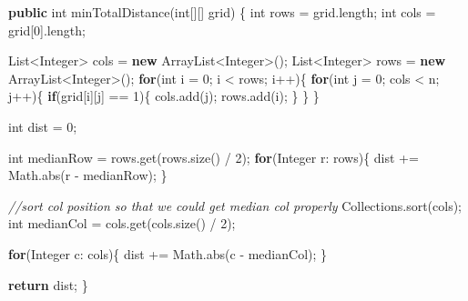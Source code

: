 \documentclass[]{book}
\newenvironment{Shaded}{\begin{snugshade}}{\end{snugshade}}
\newcommand{\BuiltInTok}[1]{#1}
\newcommand{\CommentTok}[1]{\textcolor[rgb]{0.56,0.35,0.01}{\textit{#1}}}
\newcommand{\DataTypeTok}[1]{\textcolor[rgb]{0.13,0.29,0.53}{#1}}
\newcommand{\DecValTok}[1]{\textcolor[rgb]{0.00,0.00,0.81}{#1}}
\newcommand{\FunctionTok}[1]{\textcolor[rgb]{0.00,0.00,0.00}{#1}}
\newcommand{\KeywordTok}[1]{\textcolor[rgb]{0.13,0.29,0.53}{\textbf{#1}}}
\newcommand{\NormalTok}[1]{#1}
\begin{document}
\begin{Shaded}
\begin{Highlighting}[]
\KeywordTok{public} \DataTypeTok{int} \FunctionTok{minTotalDistance}\NormalTok{(}\DataTypeTok{int}\NormalTok{[][] grid) \{}
    \DataTypeTok{int}\NormalTok{ rows = grid.}\FunctionTok{length}\NormalTok{;}
    \DataTypeTok{int}\NormalTok{ cols = grid[}\DecValTok{0}\NormalTok{].}\FunctionTok{length}\NormalTok{;}

    \BuiltInTok{List}\NormalTok{<}\BuiltInTok{Integer}\NormalTok{> cols = }\KeywordTok{new} \BuiltInTok{ArrayList}\NormalTok{<}\BuiltInTok{Integer}\NormalTok{>();}
    \BuiltInTok{List}\NormalTok{<}\BuiltInTok{Integer}\NormalTok{> rows = }\KeywordTok{new} \BuiltInTok{ArrayList}\NormalTok{<}\BuiltInTok{Integer}\NormalTok{>();}
    \KeywordTok{for}\NormalTok{(}\DataTypeTok{int}\NormalTok{ i = }\DecValTok{0}\NormalTok{; i < rows; i++)\{}
        \KeywordTok{for}\NormalTok{(}\DataTypeTok{int}\NormalTok{ j = }\DecValTok{0}\NormalTok{; cols < n; j++)\{}
            \KeywordTok{if}\NormalTok{(grid[i][j] == }\DecValTok{1}\NormalTok{)\{}
\NormalTok{                cols.}\FunctionTok{add}\NormalTok{(j);}
\NormalTok{                rows.}\FunctionTok{add}\NormalTok{(i);}
\NormalTok{            \}}
\NormalTok{        \}}
\NormalTok{    \}}

    \DataTypeTok{int}\NormalTok{ dist = }\DecValTok{0}\NormalTok{;}

    \DataTypeTok{int}\NormalTok{ medianRow = rows.}\FunctionTok{get}\NormalTok{(rows.}\FunctionTok{size}\NormalTok{() / }\DecValTok{2}\NormalTok{);}
    \KeywordTok{for}\NormalTok{(}\BuiltInTok{Integer}\NormalTok{ r: rows)\{}
\NormalTok{        dist += }\BuiltInTok{Math}\NormalTok{.}\FunctionTok{abs}\NormalTok{(r - medianRow);}
\NormalTok{    \}}

    \CommentTok{//sort col position so that we could get median col properly}
    \BuiltInTok{Collections}\NormalTok{.}\FunctionTok{sort}\NormalTok{(cols);}
    \DataTypeTok{int}\NormalTok{ medianCol = cols.}\FunctionTok{get}\NormalTok{(cols.}\FunctionTok{size}\NormalTok{() / }\DecValTok{2}\NormalTok{);}

    \KeywordTok{for}\NormalTok{(}\BuiltInTok{Integer}\NormalTok{ c: cols)\{}
\NormalTok{        dist += }\BuiltInTok{Math}\NormalTok{.}\FunctionTok{abs}\NormalTok{(c - medianCol);}
\NormalTok{    \}}

    \KeywordTok{return}\NormalTok{ dist;}
\NormalTok{\}}
\end{Highlighting}
\end{Shaded}
\end{document}
